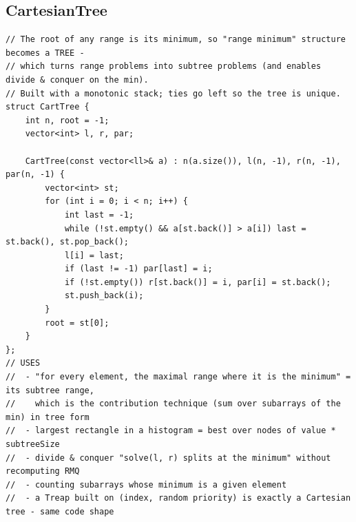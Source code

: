 \documentclass[9pt,a4paper,twocolumn]{extarticle}
\begin{document}
\subsection{CartesianTree}
\nopagebreak
\begin{lstlisting}
// The root of any range is its minimum, so "range minimum" structure becomes a TREE -
// which turns range problems into subtree problems (and enables divide & conquer on the min).
// Built with a monotonic stack; ties go left so the tree is unique.
struct CartTree {
    int n, root = -1;
    vector<int> l, r, par;

    CartTree(const vector<ll>& a) : n(a.size()), l(n, -1), r(n, -1), par(n, -1) {
        vector<int> st;
        for (int i = 0; i < n; i++) {
            int last = -1;
            while (!st.empty() && a[st.back()] > a[i]) last = st.back(), st.pop_back();
            l[i] = last;
            if (last != -1) par[last] = i;
            if (!st.empty()) r[st.back()] = i, par[i] = st.back();
            st.push_back(i);
        }
        root = st[0];
    }
};
// USES
//  - "for every element, the maximal range where it is the minimum" = its subtree range,
//    which is the contribution technique (sum over subarrays of the min) in tree form
//  - largest rectangle in a histogram = best over nodes of value * subtreeSize
//  - divide & conquer "solve(l, r) splits at the minimum" without recomputing RMQ
//  - counting subarrays whose minimum is a given element
//  - a Treap built on (index, random priority) is exactly a Cartesian tree - same code shape
\end{lstlisting}

\filbreak
\end{document}
